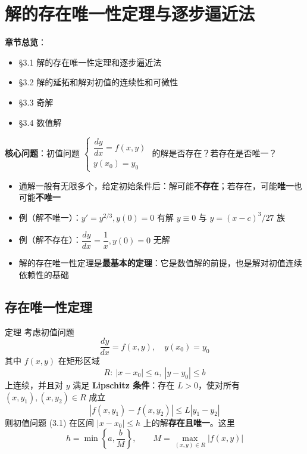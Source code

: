 \section{解的存在唯一性定理与逐步逼近法}

\textbf{章节总览}：
\begin{itemize}
    \item \S 3.1 解的存在唯一性定理和逐步逼近法
    \item \S 3.2 解的延拓和解对初值的连续性和可微性
    \item \S 3.3 奇解
    \item \S 3.4 数值解
\end{itemize}

\textbf{核心问题}：初值问题 $\begin{cases} \dfrac{dy}{dx} = f(x,y) \\ y(x_0) = y_0 \end{cases}$ 的解是否存在？若存在是否唯一？

\begin{itemize}
    \item 通解一般有无限多个，给定初始条件后：解可能\textbf{不存在}；若存在，可能\textbf{唯一}也可能\textbf{不唯一}
    \item 例（解不唯一）：$y' = y^{2/3}, y(0) = 0$ 有解 $y \equiv 0$ 与 $y = (x-c)^3/27$ 族
    \item 例（解不存在）：$\dfrac{dy}{dx} = \dfrac{1}{x}, y(0) = 0$ 无解
    \item 解的存在唯一性定理是\textbf{最基本的定理}：它是数值解的前提，也是解对初值连续依赖性的基础
\end{itemize}

\subsection{存在唯一性定理}

\begin{myTheorem}{定理}
考虑初值问题
\begin{equation}\frac{dy}{dx} = f(x, y), \quad y(x_0) = y_0 \tag{3.1}\end{equation}
其中 $f(x,y)$ 在矩形区域
\begin{equation}R: \ |x - x_0| \le a, \ |y - y_0| \le b \tag{3.2}\end{equation}
上连续，并且对 $y$ 满足 \textbf{Lipschitz 条件}：存在 $L > 0$，使对所有 $(x, y_1), (x, y_2) \in R$ 成立
$$|f(x, y_1) - f(x, y_2)| \le L|y_1 - y_2|$$
则初值问题 (3.1) 在区间 $|x - x_0| \le h$ 上的解\textbf{存在且唯一}。这里
$$h = \min\left\{a, \frac{b}{M}\right\}, \qquad M = \max_{(x,y) \in R}|f(x,y)|$$
\end{myTheorem}

